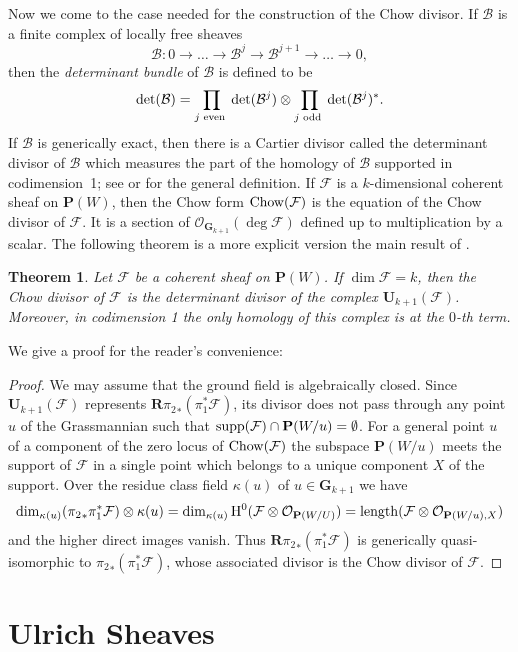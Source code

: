 \documentclass{jams-l}
\newtheorem{theorem}{Theorem}[section]
\theoremstyle{definition}
\theoremstyle{remark}
\newcommand{\B}{{\mathcal B}}
\newcommand{\F}{{\mathcal F}}
\newcommand{\GG}{{\mathbf G}}
\newcommand{\Hrm}{{\mathrm H}}
\newcommand{\Ocal}{{\mathcal O}}
\newcommand{\PP}{{\mathbf P}}
\newcommand{\RR}{{\mathbf R}}
\newcommand{\UU}{{\mathbf U}}
\newcommand{\Chow}{\mathop{\rm Chow}}
\newcommand{\length}{\mathop{\rm length}}
\newcommand{\supp}{\mathop{\rm supp}}
\newcommand{\tensor}{\otimes}
\newcommand{\rTox}{\rightarrow}
\begin{document}
Now we come to the case needed for the construction of the Chow divisor.
If $\B$ is a finite complex of locally free sheaves
\[\B: 0 \rTox \ldots \rTox \B^j \rTox \B^{j+1} \rTox \ldots \rTox 0,\]
then the {\it determinant bundle\/} of $\B$ is defined to be
\[
\det(\B) = \prod_{j \textup{ even }} \det(\B^j) 
\tensor
\prod_{j \textup{ odd }} \det(\B^j)^*.
\] 
If $\B$ is generically exact, then there is a
Cartier divisor called the determinant divisor of $\B$
which measures the part of the homology of $\B$ supported in
codimension~1; 
see \cite{Knudsen and Mumford 1976} or \cite[Appendix A]{Gelfandetal.1994} 
for the general definition.
If $\F$ is a $k$-dimensional coherent sheaf on $\PP(W)$,
then the Chow form
$\Chow(\F)$ is the equation of the Chow divisor of $\F$.
It is a section of
$\Ocal_{\GG_{k+1}}(\deg\F)$ defined up to multiplication by a scalar.
The following  theorem is a more explicit version the main result of
\cite[Chapter II]{Knudsen and Mumford 1976}. 

\begin{theorem}\label{chow point} Let $\F$ be a coherent sheaf
on $\PP(W)$. If $\dim \F = k$, then the Chow divisor of
$\F$ is the determinant divisor of the complex $\UU_{k+1}(\F)$.
Moreover, in codimension 1 the only homology of this
complex is at the $0$-th term.
\end{theorem}

We give a proof for the
reader's convenience: 

\begin{proof} We may assume that the ground field is algebraically
closed. 
Since $\UU_{k+1}(\F)$ represents ${\RR\pi_2}_*(\pi_1^*\F)$, its divisor
does not pass through any point $u$ of the Grassmannian 
such that $\supp(\F) \cap \PP(W/u)= \emptyset$. For a general point $u$
of a component of the zero locus of  $\Chow(\F)$
the subspace $\PP(W/u)$ meets the support of $\F$ in a single
point which belongs to a unique component $X$ of the support.
Over the residue class field $\kappa(u)$ of $u \in \GG_{k+1}$ we have
\[
\dim_{\kappa(u)} ({\pi_2}_*\pi_1^* \F) \tensor \kappa(u) 
= \dim_{\kappa(u)} \Hrm^0(\F \tensor \Ocal_{\PP(W/U)})
= \length(\F \tensor \Ocal_{\PP(W/u),X})
\]
and the higher direct images vanish.
Thus ${\RR\pi_2}_*(\pi_1^*\F)$ is generically quasi-\linebreak isomorphic
to ${\pi_2}_*(\pi_1^*\F)$, whose associated divisor is the Chow
divisor of $\F$.
\end{proof}

\section{Ulrich Sheaves} \label{Ulrich}
\end{document}
